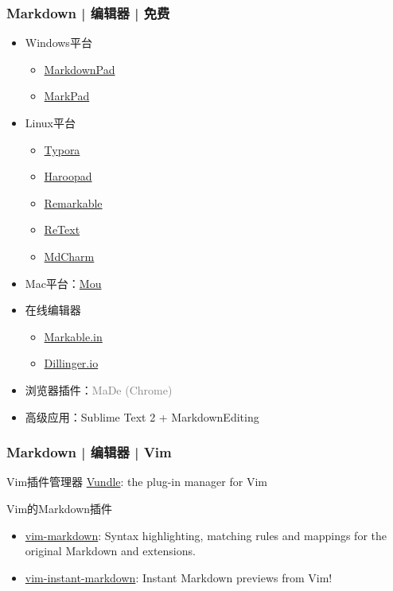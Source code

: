 \begin{frame}
  \frametitle{Markdown | 编辑器 | 免费}
  \begin{itemize}
    \item Windows平台
      \begin{itemize}
        \item \href{http://markdownpad.com/}{MarkdownPad}
        \item \href{http://code52.org/DownmarkerWPF/}{MarkPad}
      \end{itemize}
    \item Linux平台
      \begin{itemize}
        \item \href{http://www.typora.io/}{Typora}
        \item \href{http://pad.haroopress.com/}{Haroopad}
        \item \href{https://remarkableapp.github.io/}{Remarkable}
        \item \href{https://github.com/retext-project/retext}{ReText}
        \item \href{http://www.mdcharm.com/}{MdCharm}
      \end{itemize}
    \item Mac平台：\href{http://25.io/mou/}{Mou}
    \item 在线编辑器
      \begin{itemize}
        \item \href{https://markable.in/}{Markable.in}
        \item \href{https://github.com/joemccann/dillinger}{Dillinger.io}
      \end{itemize}
    \item 浏览器插件：\textcolor{gray}{MaDe (Chrome)}
    \item 高级应用：Sublime Text 2 + MarkdownEditing
  \end{itemize}
\end{frame}

\begin{frame}
  \frametitle{Markdown | 编辑器 | Vim}
  \begin{block}{Vim插件管理器}
    \href{https://github.com/VundleVim/Vundle.vim}{Vundle}: the plug-in manager for Vim
  \end{block}
  \pause
  \begin{block}{Vim的Markdown插件}
    \begin{itemize}
      \item \href{https://github.com/plasticboy/vim-markdown}{vim-markdown}: Syntax highlighting, matching rules and mappings for the original Markdown and extensions.
      \item \href{https://github.com/suan/vim-instant-markdown}{vim-instant-markdown}: Instant Markdown previews from Vim! 
    \end{itemize}
  \end{block}
\end{frame}

